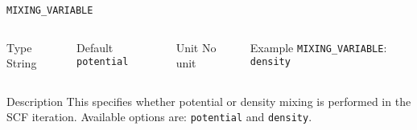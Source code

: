 \documentclass[xcolor=dvipsnames,t]{beamer}
\begin{document}
\begin{frame}[allowframebreaks]{\texttt{MIXING\_VARIABLE}} \label{MIXING_VARIABLE}
\vspace*{-12pt}
\begin{columns}
\begin{block}{Type}
String
\end{block}

\begin{block}{Default}
\texttt{potential}
\end{block}

\begin{block}{Unit}
No unit
\end{block}

\begin{block}{Example}
\texttt{MIXING\_VARIABLE}: \texttt{density}
\end{block}
\end{columns}

\begin{block}{Description}
This specifies whether potential or density mixing is performed in the SCF iteration. Available options are: \texttt{potential} and \texttt{density}.
\end{block}

\end{frame}
\end{document}

